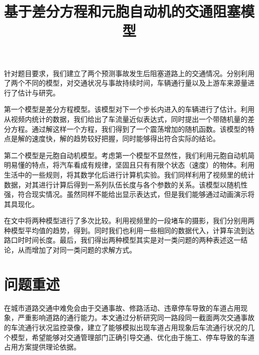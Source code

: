 \documentclass{cumcmart}
\begin{document}
\title{基于差分方程和元胞自动机的交通阻塞模型}




\maketitle
\begin{cnabstract}%
针对题目要求，我们建立了两个预测事故发生后阻塞道路上的交通情况。分别利用了两个不同的模型，对交通状况与事故持续时间，车辆通行量以及上游车来源量进行了估计与研究。

第一个模型是差分方程模型。该模型对下一个步长内进入的车辆进行了估计。利用从视频内统计的数据，我们给出了车流量近似表达式，同时提出一个带随机量的差分方程。通过解这样一个方程，我们得到了一个震荡增加的随机函数。该模型的特点是解的速度快，解的趋势较好把握，同时能够得出符合实际的结论。

第二个模型是元胞自动机模型。考虑第一个模型不显然性，我们利用元胞自动机简明易懂的特点，将汽车看成有规律，坚固且只有有限个状态（速度）的物体。利用生活中的一些规则，将其数学化后进行计算机实验。我们同样利用了视频里的统计数据，对其进行计算后得到一系列队伍长度与各个参数的关系。该模型以随机性强，符合现实情况。虽然同样不能给出显示表达式，但是我们能够通过动画演示将其具现化。

在文中将两种模型进行了多次比较。利用视频里的一段堵车的摄影，我们分别用两种模型平均值的趋势，得到。同时我们也利用一些相同的数据代入，计算车流到达路口时时间长度。最后，我们得出两种模型其实是对一类问题的两种表述这一结论，从而增加了对同一类问题的求解方式。


\end{cnabstract}

\newpage


\section{问题重述}
在城市道路交通中难免会由于交通事故、修路活动、违章停车导致的车道占用现象，严重影响道路的通行能力。本文通过分析研究同一路段同一截面两次交通事故的车流通行状况监控录像，建立了能够模拟出现车道占用现象后车流通行状况的几个模型，希望能够对交通管理部门正确引导交通、优化由于施工、停车导致的车道占用方案提供理论依据。
\end{document}
